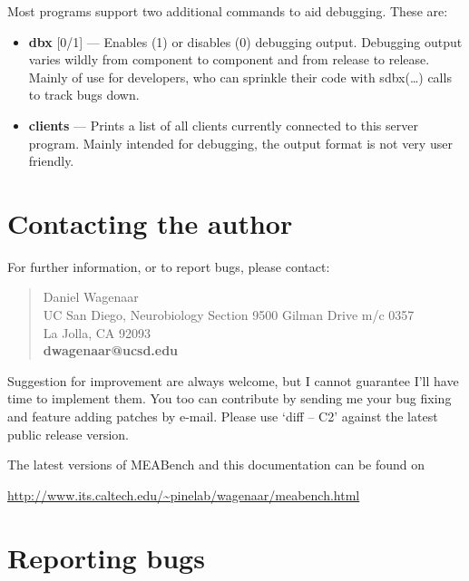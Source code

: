 \documentclass[12pt,oneside]{book}
\def\meabench{{MEABench}\xspace}
\def\cmd#1{{\bf #1}}
\begin{document}
Most programs support two additional commands to aid debugging. These
are: 

\begin{itemize}
\item \cmd{dbx} [0/1] --- Enables (1) or disables (0) debugging
output. Debugging output varies wildly from component to component and
from release to release. Mainly of use for developers, who can
sprinkle their code with sdbx(\ldots) calls to track bugs down.

\item \cmd{clients} --- Prints a list of all clients currently
connected to this server program. Mainly intended for debugging, the
output format is not very user friendly.
\end{itemize}


\section{Contacting the author}

For further information, or to report bugs, please contact:

\begin{quotation}
\noindent Daniel Wagenaar\\
UC San Diego, Neurobiology Section
9500 Gilman Drive m/c 0357\\
La Jolla, CA 92093\\
{\bf dwagenaar@ucsd.edu}
\end{quotation}

\noindent Suggestion for improvement are always welcome, but I cannot
guarantee I'll have time to implement them. You too can contribute
by sending me your bug fixing and feature adding patches by e-mail.
Please use `diff --\kern2pt C2' against the latest public release version.

The latest versions of \meabench and this documentation can be found on

\begin{center}\noindent\url{http://www.its.caltech.edu/~pinelab/wagenaar/meabench.html}\end{center}
\section{Reporting bugs}
\end{document}
